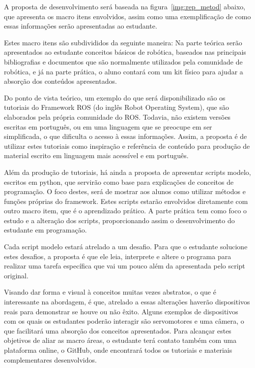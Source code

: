A proposta de desenvolvimento será baseada na figura~\ref{img:rep_metod} abaixo, que apresenta os macro itens envolvidos, assim como uma exemplificação de como essas informações serão apresentadas ao estudante. 

Estes macro itens são subdivididos da seguinte maneira: Na parte teórica serão apresentados ao estudante conceitos básicos de robótica, baseados nas principais bibliografias e documentos que são normalmente utilizados pela comunidade de robótica, e já na parte prática, o aluno contará com um kit físico para ajudar a absorção dos conteúdos apresentados.

Do ponto de vista teórico, um exemplo do que será disponibilizado são os tutoriais do Framework ROS (do inglês Robot Operating System), que são elaborados pela própria comunidade do ROS. Todavia, não existem versões escritas em português, ou em uma linguagem que se preocupe em ser simplificada, o que dificulta o acesso à essas informações. Assim, a proposta é de utilizar estes tutoriais como inspiração e referência de conteúdo para produção de material escrito em linguagem mais acessível e em português.

Além da produção de tutoriais, há ainda a proposta de apresentar scripts modelo, escritos em python, que servirão como base para explicações de conceitos
de programação. O foco destes, será de mostrar aos alunos como utilizar métodos e funções próprias do framework. Estes scripts estarão envolvidos diretamente com outro macro item, que é o aprendizado prático. A parte prática tem como foco o estudo e a alteração dos scripts, proporcionando assim o desenvolvimento do estudante em programação.

Cada script modelo estará atrelado a um desafio. Para que o estudante solucione estes desafios, a proposta é que ele leia, interprete e altere o programa
para realizar uma tarefa específica que vai um pouco além da apresentada pelo script original.

Visando dar forma e visual à conceitos muitas vezes abstratos, o que é interessante na abordagem, é que, atrelado a essas alterações haverão dispositivos
reais para demonstrar se houve ou não êxito. Alguns exemplos de dispositivos com os quais os estudantes poderão interagir são servomotores e uma câmera, o que
facilitará uma absorção dos conceitos apresentados.
Para alcançar estes objetivos de aliar as macro áreas, o estudante terá contato também com uma plataforma online, o GitHub, onde encontrará todos os tutoriais e materiais complementares desenvolvidos.

